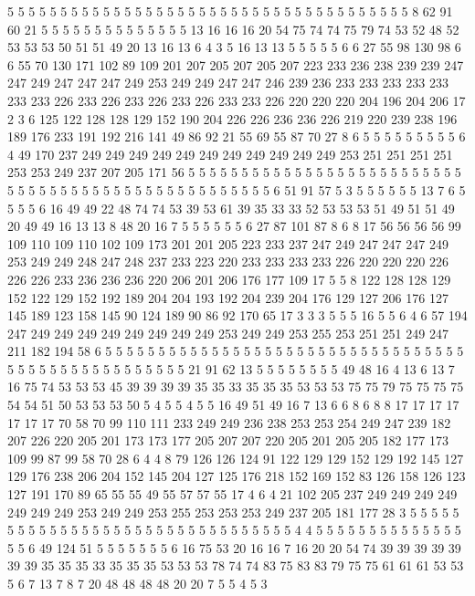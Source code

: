 5 5 5 5 5 5 5 5 5 5 5 5 5 5 5 5 5 5 5 5
5 5 5 5 5 5 5 5 5 5 5 5 5 5 5 5 5 5 8 62
91 60 21 5 5 5 5 5 5 5 5 5 5 5 5 5 5 13 16 16
16 20 54 75 74 74 75 79 74 53 52 48 52 53 53 53 50 51 51 49
20 13 16 13 6 4 3 5 16 13 13 5 5 5 5 5 6 6 27 55
98 130 98 6 6 55 70 130 171 102 89 109 201 207 205 207 205 207 223 233
236 238 239 239 247 247 249 247 247 247 249 253 249 249 247 247 246 239 236 233
233 233 233 233 233 233 226 233 226 233 226 233 226 233 233 226 220 220 220 204
196 204 206 17 2 3 6 125 122 128 128 129 152 190 204 226 226 236 236 226
219 220 239 238 196 189 176 233 191 192 216 141 49 86 92 21 55 69 55 87
70 27 8 6 5 5 5 5 5 5 5 5 5 6 4 49 170 237 249 249
249 249 249 249 249 249 249 249 249 253 251 251 251 251 253 253 249 237 207 205
171 56 5 5 5 5 5 5 5 5 5 5 5 5 5 5 5 5 5 5
5 5 5 5 5 5 5 5 5 5 5 5 5 5 5 5 5 5 5 5
5 5 5 5 5 5 5 5 5 5 5 5 5 6 51 91 57 5 3 5
5 5 5 5 5 13 7 6 5 5 5 5 6 16 49 49 22 48 74 74
53 39 53 61 39 35 33 33 52 53 53 53 51 49 51 51 49 20 49 49
16 13 13 8 48 20 16 7 5 5 5 5 5 5 6 27 87 101 87 8
6 8 17 56 56 56 56 99 109 110 109 110 102 109 173 201 201 205 223 233
237 247 249 247 247 247 249 253 249 249 248 247 248 237 233 223 220 233 233 233
233 226 220 220 220 226 226 226 233 236 236 236 220 206 201 206 176 177 109 17
5 5 8 122 128 128 129 152 122 129 152 192 189 204 204 193 192 204 239 204
176 129 127 206 176 127 145 189 123 158 145 90 124 189 90 86 92 170 65 17
3 3 3 5 5 5 16 5 5 6 4 6 57 194 247 249 249 249 249 249
249 249 249 253 249 249 253 255 253 251 251 249 247 211 182 194 58 6 5 5
5 5 5 5 5 5 5 5 5 5 5 5 5 5 5 5 5 5 5 5
5 5 5 5 5 5 5 5 5 5 5 5 5 5 5 5 5 5 5 5
5 5 5 5 5 5 5 5 5 21 91 62 13 5 5 5 5 5 5 5
5 49 48 16 4 13 6 13 7 16 75 74 53 53 53 45 39 39 39 39
35 35 33 35 35 35 53 53 53 75 75 79 75 75 75 75 54 54 51 50
53 53 53 50 5 4 5 5 4 5 5 16 49 51 49 16 7 13 6 6
8 6 8 8 17 17 17 17 17 17 17 70 58 70 99 110 111 233 249 249
236 238 253 253 254 249 247 239 182 207 226 220 205 201 173 173 177 205 207 207
220 205 201 205 205 182 177 173 109 99 87 99 58 70 28 6 4 4 8 79
126 126 124 91 122 129 129 152 129 192 145 127 129 176 238 206 204 152 145 204
127 125 176 218 152 169 152 83 126 158 126 123 127 191 170 89 65 55 55 49
55 57 57 55 17 4 6 4 21 102 205 237 249 249 249 249 249 249 249 253
249 249 253 255 253 253 253 249 237 205 181 177 28 3 5 5 5 5 5 5
5 5 5 5 5 5 5 5 5 5 5 5 5 5 5 5 5 5 5 5
5 5 5 5 5 5 4 4 5 5 5 5 5 5 5 5 5 5 5 5
5 5 5 5 6 49 124 51 5 5 5 5 5 5 5 6 16 75 53 20
16 16 7 16 20 20 54 74 39 39 39 39 39 39 39 35 35 35 33 35
35 35 53 53 53 78 74 74 83 75 83 83 79 75 75 61 61 61 53 53
5 6 7 13 7 8 7 20 48 48 48 48 20 20 7 5 5 4 5 3
